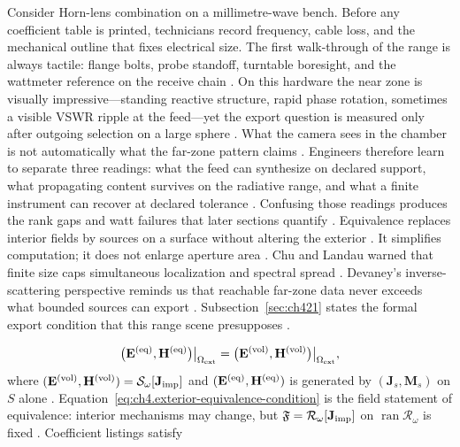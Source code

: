 \begin{physicalvignette}
Consider Horn-lens combination on a millimetre-wave bench. Before any coefficient table is printed, technicians record frequency, cable loss, and the mechanical outline that fixes electrical size. The first walk-through of the range is always tactile: flange bolts, probe standoff, turntable boresight, and the wattmeter reference on the receive chain \cite{hansen1988}.
On this hardware the near zone is visually impressive---standing reactive structure, rapid phase rotation, sometimes a visible VSWR ripple at the feed---yet the export question is measured only after outgoing selection on a large sphere \cite{harrington2001}. What the camera sees in the chamber is not automatically what the far-zone pattern claims \cite{stratton1941}.
Engineers therefore learn to separate three readings: what the feed can synthesize on declared support, what propagating content survives on the radiative range, and what a finite instrument can recover at declared tolerance \cite{devaney2004}. Confusing those readings produces the rank gaps and watt failures that later sections quantify \cite{pal2026}.
Equivalence replaces interior fields by sources on a surface without altering the exterior . It simplifies computation; it does not enlarge aperture area .
Chu and Landau warned that finite size caps simultaneous localization and spectral spread \cite{chu1948}. Devaney's inverse-scattering perspective reminds us that reachable far-zone data never exceeds what bounded sources can export \cite{devaney2004}.
Subsection~\ref{sec:ch421} states the formal export condition that this range scene presupposes \cite{stratton1941}.
\end{physicalvignette}
\begin{equation}
\label{eq:ch4.exterior-equivalence-condition}
\big(\mathbf{E}^{\mathrm{(eq)}},\mathbf{H}^{\mathrm{(eq)}}\big)\big|_{\Omega_{\mathrm{ext}}}
=
\big(\mathbf{E}^{\mathrm{(vol)}},\mathbf{H}^{\mathrm{(vol)}}\big)\big|_{\Omega_{\mathrm{ext}}},
\end{equation}
where \((\mathbf{E}^{\mathrm{(vol)}},\mathbf{H}^{\mathrm{(vol)}})=\mathcal{S}_\omega[\mathbf{J}_{\mathrm{imp}}]\) and
\((\mathbf{E}^{\mathrm{(eq)}},\mathbf{H}^{\mathrm{(eq)}})\) is generated by \((\mathbf{J}_{s},\mathbf{M}_{s})\) on \(S\) alone
\cite{stratton1941}. Equation~\eqref{eq:ch4.exterior-equivalence-condition} is the field statement of
equivalence: interior mechanisms may change, but \(\mathfrak{F}=\mathcal{R}_\omega[\mathbf{J}_{\mathrm{imp}}]\) on
\(\operatorname{ran}\mathcal{R}_\omega\) is fixed \cite{harrington2001}. Coefficient listings satisfy
